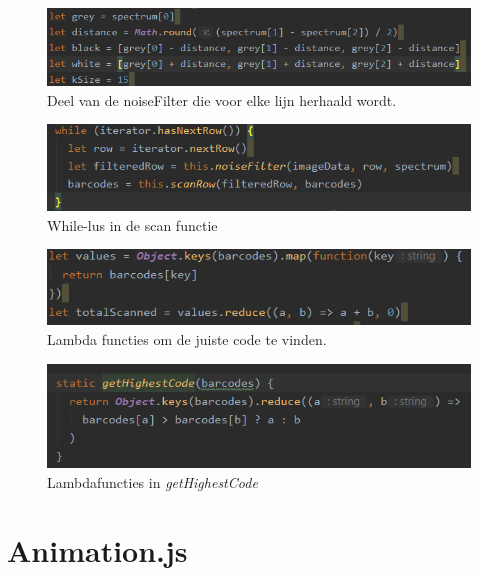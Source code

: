 \documentclass[a4paper,11pt]{article}
\begin{document}
    \begin{figure}
        \centering
        \includegraphics{img/noiseFilter}
        \caption{Deel van de noiseFilter die voor elke lijn herhaald wordt.}
        \label{noiseFilter}
    \end{figure}

    \begin{figure}
        \centering
        \includegraphics{img/startFilter}
        \caption{While-lus in de scan functie}
        \label{startFilter}
    \end{figure}
    \begin{figure}
        \centering
        \includegraphics{img/lambda}
        \caption{Lambda functies om de juiste code te vinden.}
        \label{lambda}
    \end{figure}
    \begin{figure}
        \centering
        \includegraphics{img/getHighestCode}
        \caption{Lambdafuncties in {\it getHighestCode}}
        \label{getHighestCode}
    \end{figure}

    \section{Animation.js}
\end{document}
